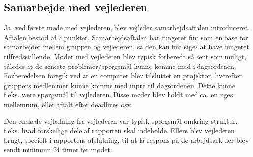 \subsection{Samarbejde med vejlederen}


Ja, ved første møde med vejlederen, blev vejleder samarbejdsaftalen introduceret. Aftalen bestod af 7 punkter. Samarbejdsaftalen har fungeret fint som en base for samarbejdet mellem gruppen og vejlederen, så den kan fint siges at have fungeret tilfredsstillende. Møder med vejlederen blev typisk forberedt så sent som muligt, således at de seneste problemer/spørgsmål kunne komme med i dagsordenen. Forberedelsen foregik ved at en computer blev tilsluttet en projektor, hvorefter gruppens medlemmer kunne komme med input til dagsordenen. Dette kunne f.eks. være spørgsmål til vejlederen. Disse møder blev holdt med ca. en uges mellemrum, eller aftalt efter deadlines osv.

Den ønskede vejledning fra vejlederen var typisk spørgsmål omkring struktur, f.eks. hvad forskellige dele af rapporten skal indeholde. Ellers blev vejlederen brugt, specielt i rapportens afslutning, til at få respons på de arbejdsark der blev sendt minimum 24 timer før mødet.
